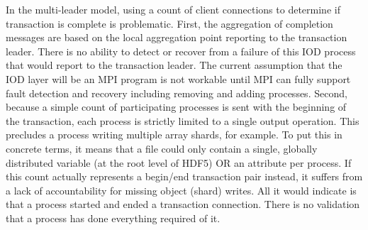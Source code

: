 \documentclass[conference]{IEEEtran}
\begin{document}
In the multi-leader model, using a count of client connections to determine if
transaction is complete is problematic.  First, the aggregation of completion
messages are based on the local aggregation point reporting to the transaction
leader.  There is no ability to detect or recover from a failure of this IOD
process that would report to the transaction leader. The current assumption
that the IOD layer will be an MPI program is not workable until MPI can fully
support fault detection and recovery including removing and adding processes.
Second, because a simple count of participating processes is sent with the
beginning of the transaction, each process is strictly limited to a single
output operation.  This precludes a process writing multiple array shards, for
example. To put this in concrete terms, it means that a file could only contain
a single, globally distributed variable (at the root level of HDF5) OR an
attribute per process. If this count actually represents a begin/end
transaction pair instead, it suffers from a lack of accountability for missing
object (shard) writes. All it would indicate is that a process started and
ended a transaction connection. There is no validation that a process has done
everything required of it.
\end{document}

